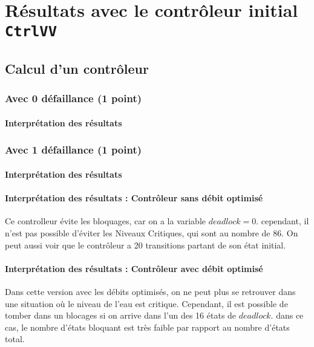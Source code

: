 \documentclass[a4paper]{book}
\begin{document}
\section{Résultats avec le contrôleur initial {\tt CtrlVV}}
\subsection{Calcul d'un contrôleur}
\subsubsection{Avec 0 défaillance (1 point)}


%
%
%
\paragraph{Interprétation des résultats}

\subsubsection{Avec 1 défaillance (1 point)}


%
%
%
\paragraph{Interprétation des résultats}
\paragraph{Interprétation des résultats : Contrôleur sans débit optimisé}
Ce controlleur évite les bloquages, car on a la variable $deadlock = 0$. cependant, il n'est pas possible d'éviter les Niveaux Critiques, qui sont au nombre de 86.
On peut aussi voir que le contrôleur a 20 transitions partant de son état initial.

\paragraph{Interprétation des résultats : Contrôleur avec débit optimisé}
Dans cette version avec les débits optimisés, on ne peut plus se retrouver dans une situation où le niveau de l'eau est critique. Cependant, il est possible de tomber dans un blocages si on arrive dans l'un des 16 états de $deadlock$.
dans ce cas, le nombre d'états bloquant est très faible par rapport au nombre d'états total.
\end{document}
